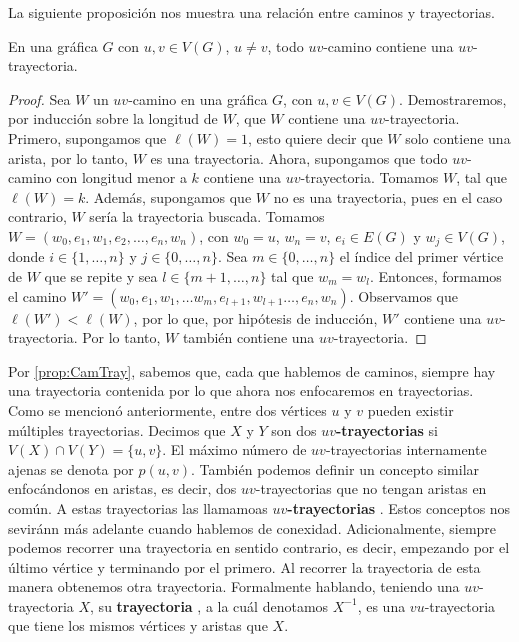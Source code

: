 La siguiente proposici\'on nos muestra una relaci\'on entre caminos y
trayectorias.  

\begin{proposicion}
\label{prop:CamTray}
    En una gr\'afica $G$ con $u, v \in V(G)$, $u \ne v$, todo $uv$-camino
    contiene una $uv$-trayectoria.
\end{proposicion}

\begin{proof}
    Sea $W$ un $uv$-camino en una gr\'afica $G$, con $u,v \in V(G)$.
    Demostraremos, por inducci\'on sobre la longitud de $W$, que $W$
    contiene una $uv$-trayectoria. Primero, supongamos que $\ell(W)=1$, esto
    quiere decir que $W$ solo contiene una arista, por lo tanto, $W$ es una
    trayectoria. Ahora, supongamos que todo $uv$-camino con longitud menor a
    $k$ contiene una $uv$-trayectoria. Tomamos $W$, tal que $\ell(W) = k$.
    Adem\'as, supongamos que $W$ no es una trayectoria, pues en el caso
    contrario, $W$ ser\'ia la trayectoria buscada. Tomamos $W=
    (w_0,e_1,w_1,e_2, \dots, e_n,w_n)$, con $w_0=u$, $w_n=v$, $e_i \in E(G)$
    y $w_j \in V(G)$, donde $i \in \{1, \dots, n\}$ y $j \in \{0, \dots,
    n\}$. Sea $m \in \{0, \dots, n\}$ el \'indice del primer v\'ertice de
    $W$ que se repite y sea $l \in \{m+1, \dots, n\}$ tal que $w_m = w_l$.
    Entonces, formamos el camino $W'= (w_0,e_1,w_1,\dots w_m, e_{l+1},
    w_{l+1} \dots, e_n,w_n)$. Observamos que $\ell(W')<\ell(W)$, por lo que,
    por hip\'otesis de inducci\'on, $W'$ contiene una $uv$-trayectoria. Por
    lo tanto, $W$ tambi\'en contiene una $uv$-trayectoria.
\end{proof}

Por \cref{prop:CamTray}, sabemos que, cada que hablemos de caminos, siempre hay
una trayectoria contenida por lo que ahora nos enfocaremos en trayectorias. Como
se mencion\'o anteriormente, entre dos v\'ertices $u$ y $v$ pueden existir
m\'ultiples trayectorias. Decimos que $X$ y $Y$ son dos
\textbf{$uv$-trayectorias}  si
$V(X)\cap V(Y)=\{u,v\}$. El m\'aximo n\'umero de $uv$-trayectorias internamente
ajenas se denota por $p(u,v)$. Tambi\'en podemos definir un concepto similar
enfoc\'andonos en aristas, es decir, dos $uv$-trayectorias que no tengan aristas
en com\'un. A estas trayectorias las llamamoas \textbf{$uv$-trayectorias}
. Estos conceptos nos sevir\'ann
m\'as adelante cuando hablemos de conexidad. Adicionalmente, siempre podemos
recorrer una trayectoria en sentido contrario, es decir, empezando por el
\'ultimo v\'ertice y terminando por el primero. Al recorrer la trayectoria de
esta manera obtenemos otra trayectoria. Formalmente hablando, teniendo una
$uv$-trayectoria $X$, su \textbf{trayectoria} ,
a la cu\'al denotamos $X^{-1}$, es una $vu$-trayectoria que tiene los mismos
v\'ertices y aristas que $X$.

